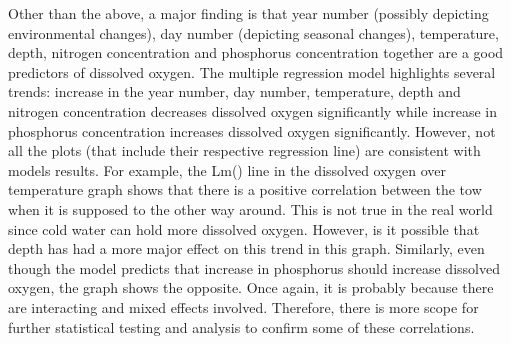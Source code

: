 \documentclass[12pt,]{article}
\begin{document}
Other than the above, a major finding is that year number (possibly
depicting environmental changes), day number (depicting seasonal
changes), temperature, depth, nitrogen concentration and phosphorus
concentration together are a good predictors of dissolved oxygen. The
multiple regression model highlights several trends: increase in the
year number, day number, temperature, depth and nitrogen concentration
decreases dissolved oxygen significantly while increase in phosphorus
concentration increases dissolved oxygen significantly. However, not all
the plots (that include their respective regression line) are consistent
with models results. For example, the Lm() line in the dissolved oxygen
over temperature graph shows that there is a positive correlation
between the tow when it is supposed to the other way around. This is not
true in the real world since cold water can hold more dissolved oxygen.
However, is it possible that depth has had a more major effect on this
trend in this graph. Similarly, even though the model predicts that
increase in phosphorus should increase dissolved oxygen, the graph shows
the opposite. Once again, it is probably because there are interacting
and mixed effects involved. Therefore, there is more scope for further
statistical testing and analysis to confirm some of these correlations.
\end{document}
